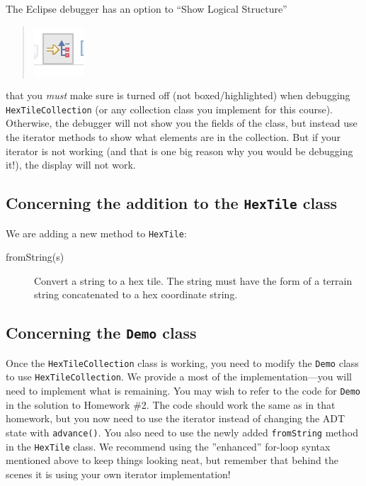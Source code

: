 \documentclass[11pt]{article}
\begin{document}
The Eclipse debugger has an option to ``Show Logical Structure''
\begin{quote}
  \includegraphics{show-logical-structure}
\end{quote}
that you \emph{must} make sure is turned off (not boxed/highlighted)
when debugging \texttt{HexTileCollection} (or any collection class you
implement for this course).
Otherwise, the debugger will not show you the fields of the class,
but instead use the iterator methods to show what elements are in the collection.
But if your iterator is not working (and that is one big reason why you would be debugging it!), 
the display will not work.

\subsection{Concerning the addition to the \texttt{HexTile} class}

We are adding a new method to \texttt{HexTile}:
\begin{description}
  \item[fromString(s)] Convert a string to a hex tile.  The string
    must have the form of a terrain string concatenated to a hex
    coordinate string.
\end{description}

\subsection{Concerning the \texttt{Demo} class}

Once the \texttt{HexTileCollection} class is working, you need to
modify the \texttt{Demo} class 
to use \texttt{HexTileCollection}.
We provide a most of the implementation---you will need to implement
what is remaining.  You may wish to refer to the code for
\verb|Demo| in the solution to Homework \#2.  The code should work the same
as in that homework, but you now need to use the iterator instead of changing the ADT state with \texttt{advance()}.
You also need to use the newly added \texttt{fromString} method in the \texttt{HexTile} class.
We recommend using the ''enhanced'' for-loop syntax mentioned above to keep things looking neat, but remember that behind the scenes it is using your own
iterator implementation!
\end{document}
